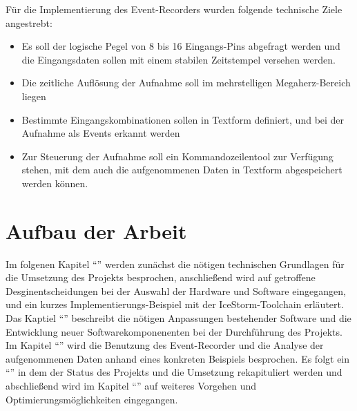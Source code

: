 Für die Implementierung des Event-Recorders wurden folgende technische Ziele angestrebt:
\begin{itemize}
\item Es soll der logische Pegel von 8 bis 16 Eingangs-Pins abgefragt werden und die Eingangsdaten sollen mit einem stabilen Zeitstempel versehen werden.
\item Die zeitliche Auflösung der Aufnahme soll im mehrstelligen Megaherz-Bereich liegen
\item Bestimmte Eingangskombinationen sollen in Textform definiert, und bei der Aufnahme als Events erkannt werden
\item Zur Steuerung der Aufnahme soll ein Kommandozeilentool zur Verfügung stehen, mit dem auch die aufgenommenen Daten in Textform abgespeichert werden können.
\end{itemize} 

\section{Aufbau der Arbeit}
\label{ch:Einfuehrung:Aufbau}

Im folgenen Kapitel ``'' werden zunächst die nötigen technischen Grundlagen für die Umsetzung des Projekts besprochen, anschließend wird auf getroffene Desginentscheidungen bei der Auswahl der Hardware und Software eingegangen, und ein kurzes Implementierungs-Beispiel mit der IceStorm-Toolchain erläutert.
Das Kaptiel ``'' beschreibt die nötigen Anpassungen bestehender Software und die Entwicklung neuer Softwarekomponenenten bei der Durchführung des Projekts.
Im Kapitel ``'' wird die Benutzung des Event-Recorder und die Analyse der aufgenommenen Daten anhand eines konkreten Beispiels besprochen.
Es folgt ein ``'' in dem der Status des Projekts und die Umsetzung rekapituliert werden und abschließend wird im Kapitel ``'' auf weiteres Vorgehen und Optimierungsmöglichkeiten eingegangen.




